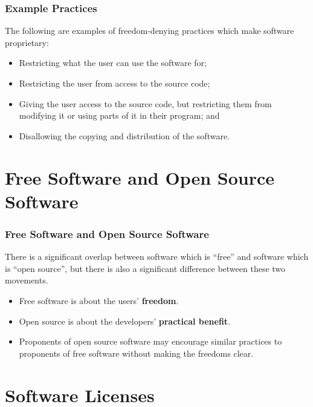\documentclass{beamer}
\begin{document}

\begin{frame}
\frametitle{Example Practices}

The following are examples of freedom-denying practices which make software 
proprietary:

\begin{itemize}
\item Restricting what the user can use the software for;
\item Restricting the user from access to the source code;
\item Giving the user access to the source code, but restricting them 
  from modifying it or using parts of it in their program; and
\item Disallowing the copying and distribution of the software.
\end{itemize}

\end{frame}


\section{Free Software and Open Source Software}

\begin{frame}
\frametitle{Free Software and Open Source Software}

There is a significant overlap between software which is ``free'' 
and software which is ``open source'', but there is also a significant 
difference between these two movements.

\begin{itemize}
\item Free software is about the users' {\bf freedom}.
\item Open source is about the developers' {\bf practical benefit}.
\item Proponents of open source software may encourage similar practices 
  to proponents of free software without making the freedoms clear.
\end{itemize}

\end{frame}


\section{Software Licenses}
\end{document}

